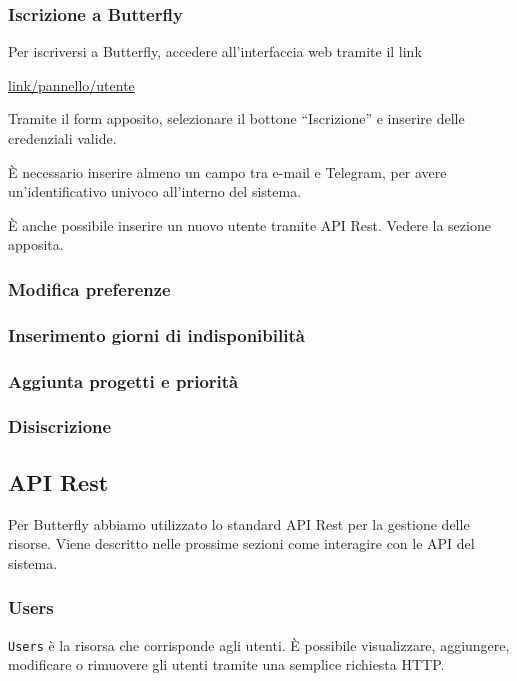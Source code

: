 \subsubsection{Iscrizione a Butterfly}

Per iscriversi a Butterfly, accedere all'interfaccia web tramite il link

\begin{center}
    \url{link/pannello/utente}
\end{center}

Tramite il form apposito, selezionare il bottone ``Iscrizione'' e inserire delle credenziali valide.

È necessario inserire almeno un campo tra e-mail e Telegram, per avere un'identificativo univoco
all'interno del sistema.

È anche possibile inserire un nuovo utente tramite API Rest. Vedere la sezione apposita.


\subsubsection{Modifica preferenze}

\subsubsection{Inserimento giorni di indisponibilità}

\subsubsection{Aggiunta progetti e priorità}

\subsubsection{Disiscrizione}


\subsection{API Rest}

Per Butterfly abbiamo utilizzato lo standard API Rest per la gestione delle risorse.
Viene descritto nelle prossime sezioni come interagire con le API del sistema.

\subsubsection{Users}

\texttt{Users} è la risorsa che corrisponde agli utenti.
È possibile visualizzare, aggiungere, modificare o rimuovere gli utenti tramite una semplice
richiesta HTTP.

